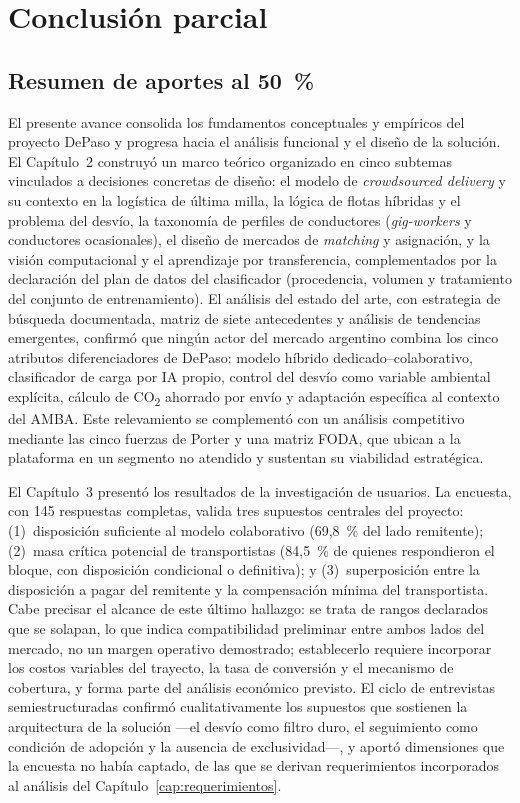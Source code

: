 \chapter{Conclusión parcial}\label{conclusions}
{\color{nuevo}%

\section{Resumen de aportes al 50~\%}

El presente avance consolida los fundamentos conceptuales y empíricos del proyecto DePaso y progresa hacia el análisis funcional y el diseño de la solución. El Capítulo~2 construyó un marco teórico organizado en cinco subtemas vinculados a decisiones concretas de diseño: el modelo de \emph{crowdsourced delivery} y su contexto en la logística de última milla, la lógica de flotas híbridas y el problema del desvío, la taxonomía de perfiles de conductores (\emph{gig-workers} y conductores ocasionales), el diseño de mercados de \emph{matching} y asignación, y la visión computacional y el aprendizaje por transferencia, complementados por la declaración del plan de datos del clasificador (procedencia, volumen y tratamiento del conjunto de entrenamiento). El análisis del estado del arte, con estrategia de búsqueda documentada, matriz de siete antecedentes y análisis de tendencias emergentes, confirmó que ningún actor del mercado argentino combina los cinco atributos diferenciadores de DePaso: modelo híbrido dedicado--colaborativo, clasificador de carga por IA propio, control del desvío como variable ambiental explícita, cálculo de CO\textsubscript{2} ahorrado por envío y adaptación específica al contexto del AMBA. Este relevamiento se complementó con un análisis competitivo mediante las cinco fuerzas de Porter y una matriz FODA, que ubican a la plataforma en un segmento no atendido y sustentan su viabilidad estratégica.

El Capítulo~3 presentó los resultados de la investigación de usuarios. La encuesta, con 145 respuestas completas, valida tres supuestos centrales del proyecto: (1)~disposición suficiente al modelo colaborativo (69,8~\% del lado remitente); (2)~masa crítica potencial de transportistas (84,5~\% de quienes respondieron el bloque, con disposición condicional o definitiva); y (3)~superposición entre la disposición a pagar del remitente y la compensación mínima del transportista. Cabe precisar el alcance de este último hallazgo: se trata de rangos declarados que se solapan, lo que indica compatibilidad preliminar entre ambos lados del mercado, no un margen operativo demostrado; establecerlo requiere incorporar los costos variables del trayecto, la tasa de conversión y el mecanismo de cobertura, y forma parte del análisis económico previsto. El ciclo de entrevistas semiestructuradas confirmó cualitativamente los supuestos que sostienen la arquitectura de la solución —el desvío como filtro duro, el seguimiento como condición de adopción y la ausencia de exclusividad—, y aportó dimensiones que la encuesta no había captado, de las que se derivan requerimientos incorporados al análisis del Capítulo~\ref{cap:requerimientos}.

}
